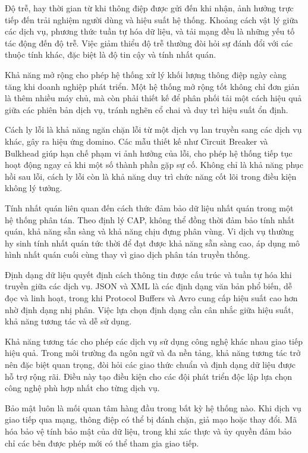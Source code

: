 Độ trễ, hay thời gian từ khi thông điệp được gửi đến khi nhận, ảnh hưởng trực tiếp đến trải nghiệm người dùng và hiệu suất hệ thống. Khoảng cách vật lý giữa các dịch vụ, phương thức tuần tự hóa dữ liệu, và tải mạng đều là những yếu tố tác động đến độ trễ. Việc giảm thiểu độ trễ thường đòi hỏi sự đánh đổi với các thuộc tính khác, đặc biệt là độ tin cậy và tính nhất quán.

Khả năng mở rộng cho phép hệ thống xử lý khối lượng thông điệp ngày càng tăng khi doanh nghiệp phát triển. Một hệ thống mở rộng tốt không chỉ đơn giản là thêm nhiều máy chủ, mà còn phải thiết kế để phân phối tải một cách hiệu quả giữa các phiên bản dịch vụ, tránh nghẽn cổ chai và duy trì hiệu suất ổn định.

Cách ly lỗi là khả năng ngăn chặn lỗi từ một dịch vụ lan truyền sang các dịch vụ khác, gây ra hiệu ứng domino. Các mẫu thiết kế như Circuit Breaker và Bulkhead giúp hạn chế phạm vi ảnh hưởng của lỗi, cho phép hệ thống tiếp tục hoạt động ngay cả khi một số thành phần gặp sự cố. Không chỉ là khả năng phục hồi sau lỗi, cách ly lỗi còn là khả năng duy trì chức năng cốt lõi trong điều kiện không lý tưởng.

Tính nhất quán liên quan đến cách thức đảm bảo dữ liệu nhất quán trong một hệ thống phân tán. Theo định lý CAP, không thể đồng thời đảm bảo tính nhất quán, khả năng sẵn sàng và khả năng chịu đựng phân vùng. Vi dịch vụ thường hy sinh tính nhất quán tức thời để đạt được khả năng sẵn sàng cao, áp dụng mô hình nhất quán cuối cùng thay vì giao dịch phân tán truyền thống.

Định dạng dữ liệu quyết định cách thông tin được cấu trúc và tuần tự hóa khi truyền giữa các dịch vụ. JSON và XML là các định dạng văn bản phổ biến, dễ đọc và linh hoạt, trong khi Protocol Buffers và Avro cung cấp hiệu suất cao hơn nhờ định dạng nhị phân. Việc lựa chọn định dạng cần cân nhắc giữa hiệu suất, khả năng tương tác và dễ sử dụng.

Khả năng tương tác cho phép các dịch vụ sử dụng công nghệ khác nhau giao tiếp hiệu quả. Trong môi trường đa ngôn ngữ và đa nền tảng, khả năng tương tác trở nên đặc biệt quan trọng, đòi hỏi các giao thức chuẩn và định dạng dữ liệu được hỗ trợ rộng rãi. Điều này tạo điều kiện cho các đội phát triển độc lập lựa chọn công nghệ phù hợp nhất cho từng dịch vụ.

Bảo mật luôn là mối quan tâm hàng đầu trong bất kỳ hệ thống nào. Khi dịch vụ giao tiếp qua mạng, thông điệp có thể bị đánh chặn, giả mạo hoặc thay đổi. Mã hóa bảo vệ tính bảo mật của dữ liệu, trong khi xác thực và ủy quyền đảm bảo chỉ các bên được phép mới có thể tham gia giao tiếp.

